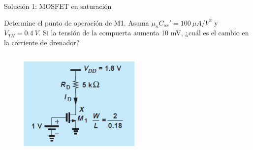 \documentclass[t,aspectratio=169,10pt]{beamer}
\begin{document}
\begin{frame}{Solución 1: MOSFET en saturación}

Determine el punto de operación de M1. Asuma $\mu_n C_{ox}' = 100\ \mu{}A/V^2$ y $V_{TH} = 0.4\ V$. Si la tensión de la compuerta aumenta 10 mV, ¿cuál es el cambio en la corriente de drenador?

\begin{columns}

\begin{column}{0.5\textwidth}

\begin{figure}[H]
    \centering
    \includegraphics[width=0.7\textwidth]{figuras/mosfet_ejemplo_1.png}
\end{figure}

\end{column}

\begin{column}{0.5\textwidth}

\end{column}

\end{columns}

\end{frame}
\end{document}
